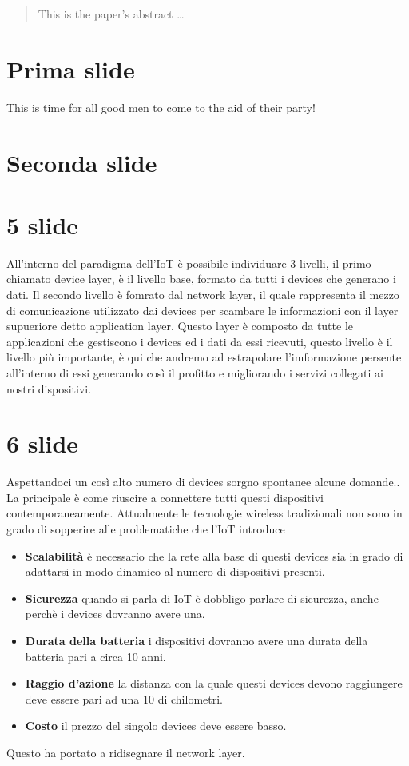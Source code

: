 \documentclass[12pt]{article}
\begin{document}
\maketitle

\begin{abstract}
This is the paper's abstract \ldots
\end{abstract}

\section{Prima slide}
This is time for all good men to come to the aid of their party!

\section{Seconda slide}
\section{5 slide}
All'interno del paradigma dell'IoT è possibile individuare 3 livelli, il primo
chiamato device layer, è il livello base, formato da tutti i devices che generano i dati.
Il secondo livello è fomrato dal network layer, il quale rappresenta il mezzo di
comunicazione utilizzato dai devices per scambare le informazioni con il layer
supueriore detto application layer. Questo layer è composto da tutte le
applicazioni che gestiscono i devices ed i dati da essi ricevuti, questo livello
è il livello più importante, è qui che andremo ad estrapolare l'imformazione
persente all'interno di essi generando così il profitto e migliorando i servizi
collegati ai nostri dispositivi.
\section{6 slide}
Aspettandoci un così alto numero di devices sorgno spontanee alcune domande..
La principale è come riuscire a connettere tutti questi dispositivi
contemporaneamente. 
Attualmente le tecnologie wireless tradizionali non sono in grado di sopperire 
alle problematiche che l'IoT introduce  
\begin{itemize}
	\item	\textbf{Scalabilità} è necessario che la rete alla base di questi devices
			sia in grado di adattarsi in modo dinamico al numero di dispositivi
			presenti.
	\item	\textbf{Sicurezza} quando si parla di IoT è dobbligo parlare di
			sicurezza, anche perchè i devices dovranno avere una. 
	\item	\textbf{Durata della batteria} i dispositivi dovranno avere una
			durata della batteria pari a circa 10 anni.
	\item	\textbf{Raggio d'azione} la distanza con la quale questi devices
			devono raggiungere deve essere pari ad una 10 di chilometri.
	\item	\textbf{Costo} il prezzo del singolo devices deve essere basso.
\end{itemize}
Questo ha portato a ridisegnare il network layer.
\end{document}
